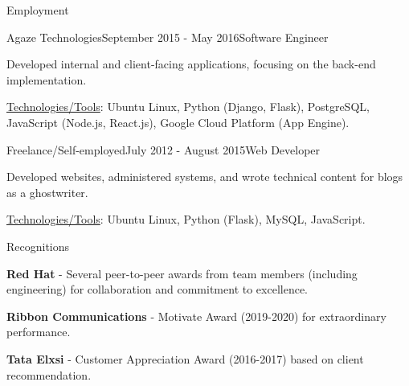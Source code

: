 \documentclass{resume} %
\begin{document}
\begin{rSection}{Employment}

\begin{rSubsection}{Agaze Technologies}{September 2015 - May 2016}{Software Engineer}{}
\item Developed internal and client-facing applications, focusing on the back-end implementation.
\item \underline{Technologies/Tools}: Ubuntu Linux, Python (Django, Flask), PostgreSQL, JavaScript (Node.js, React.js), Google Cloud Platform (App Engine).
\end{rSubsection}


\begin{rSubsection}{Freelance/Self-employed}{July 2012 - August 2015}{Web Developer}{}
\item Developed websites, administered systems, and wrote technical content for blogs as a ghostwriter.
\item \underline{Technologies/Tools}: Ubuntu Linux, Python (Flask), MySQL, JavaScript.
\end{rSubsection}

\end{rSection}


\begin{rSection}{Recognitions}

\item {\bf Red Hat} - Several peer-to-peer awards from team members (including engineering) for collaboration and commitment to excellence.
\item {\bf Ribbon Communications} - Motivate Award (2019-2020) for extraordinary performance.
\item {\bf Tata Elxsi} - Customer Appreciation Award (2016-2017) based on client recommendation.

\end{rSection}



\end{document}
